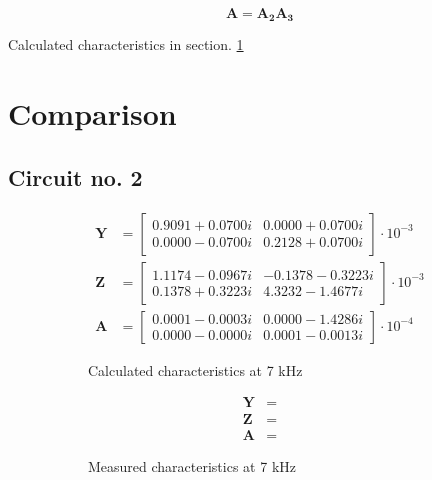 \documentclass[notitlepage, a4paper, 11pt]{article}
\begin{document}
	\begin{equation}
		\mathbf{A} = \mathbf{A_2} \mathbf{A_3}
	\end{equation}
	
	Calculated characteristics in section. \ref{sec:comparison}
		
	\section{Comparison}\label{sec:comparison}
	\subsection{Circuit no. 2}
	
		\begin{figure}[H]
		\begin{subfigure}{0.45\textwidth}
			\begin{align*}
				\mathbf{Y} &= 
				\begin{bmatrix}
					0.9091 + 0.0700i  & 0.0000 + 0.0700i \\
					0.0000 - 0.0700i  & 0.2128 + 0.0700i
				\end{bmatrix}
				\cdot 10^{-3}
				\\
				\mathbf{Z} &= 
				\begin{bmatrix}
					1.1174 - 0.0967i & -0.1378 - 0.3223i \\
					0.1378 + 0.3223i & 4.3232 - 1.4677i
				\end{bmatrix}
				\cdot 10^{-3}
				\\
				\mathbf{A} &= 
				\begin{bmatrix}
					0.0001 - 0.0003i & 0.0000 - 1.4286i \\
					0.0000 - 0.0000i & 0.0001 - 0.0013i
				\end{bmatrix}
				\cdot 10^{-4}
			\end{align*}
			\caption{Calculated characteristics at 7 kHz}
		\end{subfigure}
		\hfill
		\begin{subfigure}{0.45\textwidth}
			\begin{align*}
				\mathbf{Y} &= 
				\\
				\mathbf{Z} &= 		
				\\
				\mathbf{A} &= 
			\end{align*}
			\caption{Measured characteristics at 7 kHz}
		\end{subfigure}
		\hfill
		\begin{subfigure}{0.45\textwidth}
			\begin{align*}

\end{align*}
\end{subfigure}
\end{figure}
\end{document}
